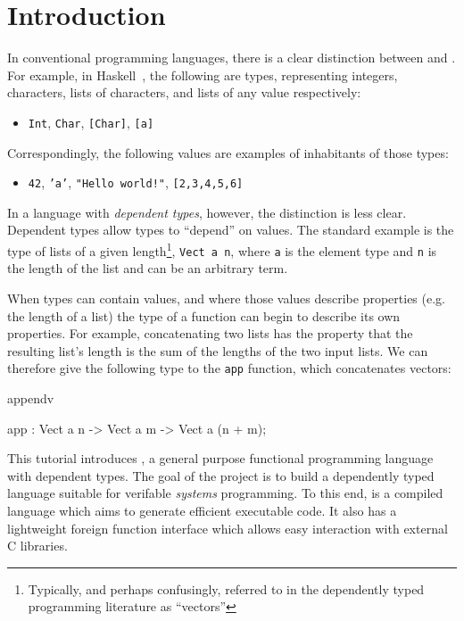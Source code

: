 \section{Introduction}

In conventional programming languages, there is a clear distinction between
 and . For example, in Haskell~\cite{haskell-report},
the following are types, representing integers, characters, lists of characters,
and lists of any value respectively:

\begin{itemize}
\item \texttt{Int}, \texttt{Char}, \texttt{[Char]}, \texttt{[a]}
\end{itemize}

\noindent
Correspondingly, the following values are examples of inhabitants of those types:

\begin{itemize}
\item \texttt{42}, \texttt{'a'}, \texttt{"Hello world!"}, \texttt{[2,3,4,5,6]}
\end{itemize}

In a language with \emph{dependent types}, however, the distinction is less
clear.  Dependent types allow types to ``depend'' on values. The standard
example is the type of lists of a given length\footnote{Typically, and perhaps
confusingly, referred to in the dependently typed programming literature as
``vectors''}, \texttt{Vect a n}, where \texttt{a} is the element type and
\texttt{n} is the length of the list and can be an arbitrary
term.

When types can contain values, and where those values describe properties (e.g.
the length of a list)
the type of a function can begin to describe its own properties. For example,
concatenating two lists has the property that the resulting list's length is
the sum of the lengths of the two input lists. We can therefore give the following type 
to the  \texttt{app} function, which concatenates vectors: 

\begin{SaveVerbatim}{appendv}

app : Vect a n -> Vect a m -> Vect a (n + m);

\end{SaveVerbatim}


This tutorial introduces \Idris{}, a general purpose functional 
programming language with dependent types.
The goal of the \Idris{} project is to build a dependently typed language suitable
for verifable \emph{systems} programming. To this end, \Idris{} is a compiled language
which aims to generate efficient executable code. It also has a lightweight foreign
function interface which allows easy interaction with external C libraries.

